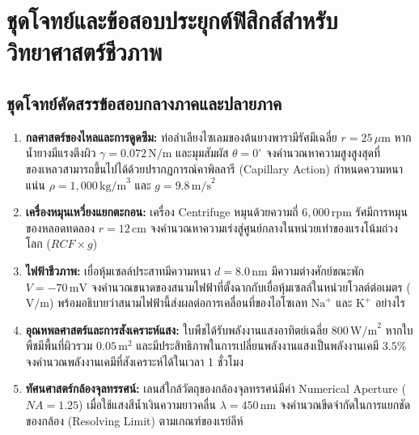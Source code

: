 \chapter{ชุดโจทย์และข้อสอบประยุกต์ฟิสิกส์สำหรับวิทยาศาสตร์ชีวภาพ}
\label{app:bio_problems}

\section{ชุดโจทย์คัดสรรข้อสอบกลางภาคและปลายภาค}

\begin{enumerate}
    \item \textbf{กลศาสตร์ของไหลและการดูดซึม:} ท่อลำเลียงไซเลมของต้นยางพารามีรัศมีเฉลี่ย $r = 25\,\mu\text{m}$ หากน้ำยางมีแรงตึงผิว $\gamma = 0.072\,\text{N/m}$ และมุมสัมผัส $\theta = 0^\circ$ จงคำนวณหาความสูงสูงสุดที่ของเหลวสามารถขึ้นไปได้ด้วยปรากฏการณ์คาพิลลารี (Capillary Action) กำหนดความหนาแน่น $\rho = 1,000\,\text{kg/m}^3$ และ $g = 9.8\,\text{m/s}^2$
    
    \item \textbf{เครื่องหมุนเหวี่ยงแยกตะกอน:} เครื่อง Centrifuge หมุนด้วยความถี่ $6,000\,\text{rpm}$ รัศมีการหมุนของหลอดทดลอง $r = 12\,\text{cm}$ จงคำนวณหาความเร่งสู่ศูนย์กลางในหน่วยเท่าของแรงโน้มถ่วงโลก ($RCF \times g$)
    
    \item \textbf{ไฟฟ้าชีวภาพ:} เยื่อหุ้มเซลล์ประสาทมีความหนา $d = 8.0\,\text{nm}$ มีความต่างศักย์ขณะพัก $V = -70\,\text{mV}$ จงคำนวณขนาดของสนามไฟฟ้าที่ตั้งฉากกับเยื่อหุ้มเซลล์ในหน่วยโวลต์ต่อเมตร ($\text{V/m}$) พร้อมอธิบายว่าสนามไฟฟ้านี้ส่งผลต่อการเคลื่อนที่ของไอโซเลท $\text{Na}^+$ และ $\text{K}^+$ อย่างไร
    
    \item \textbf{อุณหพลศาสตร์และการสังเคราะห์แสง:} ใบพืชได้รับพลังงานแสงอาทิตย์เฉลี่ย $800\,\text{W/m}^2$ หากใบพืชมีพื้นที่ผิวรวม $0.05\,\text{m}^2$ และมีประสิทธิภาพในการเปลี่ยนพลังงานแสงเป็นพลังงานเคมี $3.5\%$ จงคำนวณพลังงานเคมีที่สังเคราะห์ได้ในเวลา 1 ชั่วโมง
    
    \item \textbf{ทัศนศาสตร์กล้องจุลทรรศน์:} เลนส์ใกล้วัตถุของกล้องจุลทรรศน์มีค่า Numerical Aperture ($NA = 1.25$) เมื่อใช้แสงสีน้ำเงินความยาวคลื่น $\lambda = 450\,\text{nm}$ จงคำนวณขีดจำกัดในการแยกชัดของกล้อง (Resolving Limit) ตามเกณฑ์ของเรย์ลีห์
\end{enumerate}
